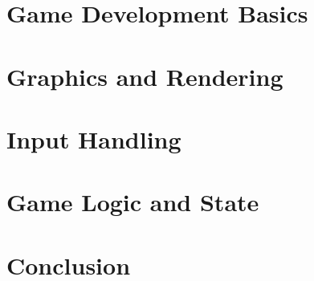 \documentclass{article}
\begin{document}
\section{Game Development Basics}

\section{Graphics and Rendering}

\section{Input Handling}

\section{Game Logic and State}

\section{Conclusion}
\end{document}
